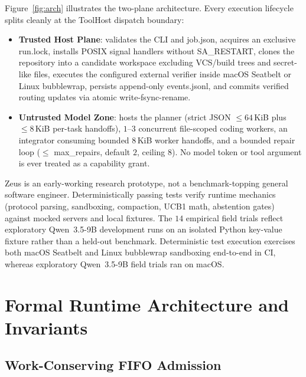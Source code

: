 \documentclass[10pt,letterpaper]{article}
\newcommand{\code}[1]{\textnormal{\small\ttfamily #1}}
\begin{document}
Figure~\ref{fig:arch} illustrates the two-plane architecture. Every execution lifecycle splits cleanly at the \code{ToolHost} dispatch boundary:
\begin{itemize}[leftmargin=1.4em,itemsep=2pt,topsep=2pt]
  \item \textbf{Trusted Host Plane}: validates the CLI and \code{job.json}, acquires an exclusive \code{run.lock}, installs POSIX signal handlers without \code{SA\_RESTART}, clones the repository into a candidate workspace excluding VCS/build trees and secret-like files, executes the configured external verifier inside macOS Seatbelt or Linux \code{bubblewrap}, persists append-only \code{events.jsonl}, and commits verified routing updates via atomic write-\code{fsync}-rename.
  \item \textbf{Untrusted Model Zone}: hosts the planner (strict JSON $\le 64$\,KiB plus $\le 8$\,KiB per-task handoffs), $1$--$3$ concurrent file-scoped coding workers, an integrator consuming bounded $8$\,KiB worker handoffs, and a bounded repair loop ($\le$ \code{max\_repairs}, default $2$, ceiling $8$). No model token or tool argument is ever treated as a capability grant.
\end{itemize}

\begin{caveatbox}
Zeus is an early-working research prototype, not a benchmark-topping general software engineer. Deterministically passing tests verify runtime mechanics (protocol parsing, sandboxing, compaction, UCB1 math, abstention gates) against mocked servers and local fixtures. The $14$ empirical field trials reflect exploratory Qwen~3.5-9B development runs on an isolated Python key-value fixture rather than a held-out benchmark. Deterministic test execution exercises both macOS Seatbelt and Linux \code{bubblewrap} sandboxing end-to-end in CI, whereas exploratory Qwen~3.5-9B field trials ran on macOS.
\end{caveatbox}

\section{Formal Runtime Architecture and Invariants}
\label{sec:invariants}

\subsection{Work-Conserving FIFO Admission}
\end{document}
